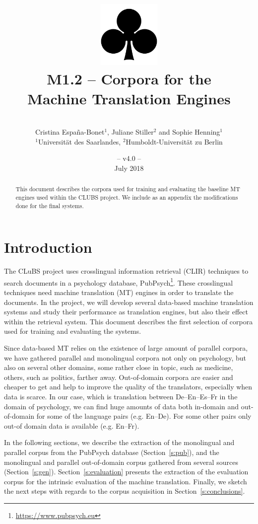 \documentclass[a4paper,11pt]{article}
\title{
\includegraphics[width=3cm]{./img/200px-SuitClubs.png} \\
\Huge M1.2 -- Corpora for the \\ Machine Translation Engines \\ 
}
\author{\vspace*{1cm}\\ \LARGE Cristina Espa\~na-Bonet$^1$, Juliane Stiller$^2$ and Sophie Henning$^1$ \medskip \\ \Large $^1$Universit\"at des Saarlandes, $^2$Humboldt-Universit\"at zu Berlin}
\date{\vspace*{2cm} -- v4.0 --\\July 2018}
\begin{document}
\clearpage\maketitle
\thispagestyle{empty}

\vspace*{5cm}
\begin{abstract}
This document describes the corpora used for training and evaluating the baseline MT engines used within the CLUBS project. We include as an appendix the modifications done for the final systems.
\end{abstract}

\newpage
\tableofcontents
\clearpage


\section{Introduction}
\label{s:intro}

The CLuBS project uses crosslingual information retrieval (CLIR) techniques to search documents in a psychology database, PubPsych\footnote{\url{https://www.pubpsych.eu}}. These crosslingual techniques need machine translation (MT) engines in order to translate the documents. In the project, we will develop several data-based machine translation systems and study their performance as translation engines, but also their effect within the retrieval system. This document describes the first selection of corpora used for training and evaluating the systems.

Since data-based MT relies on the existence of large amount of parallel corpora, we have gathered parallel and monolingual corpora not only on psychology, but also on several other domains, some rather close in topic, such as medicine, others, such as politics, farther away. Out-of-domain corpora are easier and cheaper to get and help to improve the quality of the translators, especially when data is scarce. In our case, which is translation between De--En--Es--Fr in the domain of psychology, we can find huge amounts of data both in-domain and out-of-domain for some of the language pairs (e.g. En--De). For some other pairs only out-of domain data is available (e.g. En--Fr). 

In the following sections, we describe the extraction of the monolingual and parallel corpus from the PubPsych database (Section~\ref{s:pub}), and the monolingual and parallel out-of-domain corpus gathered from several sources (Section~\ref{s:gen}). 
Section~\ref{s:evaluation} presents the extraction of the evaluation corpus for the intrinsic evaluation of the machine translation. Finally, we sketch the next steps with regards to the corpus acquisition in Section~\ref{s:conclusions}.
\end{document}
